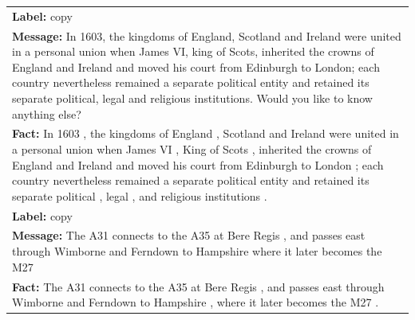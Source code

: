 \begin{table}
\begin{tabular}{p{15cm}}
        \midrule
        \textbf{Label:} copy                                                                                                                                                                                                                                                                                                                                                                                         \\
        \textbf{Message:} In 1603, the kingdoms of England, Scotland and Ireland were united in a personal union when James VI, king of Scots, inherited the crowns of England and Ireland and moved his court from Edinburgh to London; each country nevertheless remained a separate political entity and retained its separate political, legal and religious institutions. Would you like to know anything else? \\
        \textbf{Fact:} In 1603 , the kingdoms of England , Scotland and Ireland were united in a personal union when James VI , King of Scots , inherited the crowns of England and Ireland and moved his court from Edinburgh to London ; each country nevertheless remained a separate political entity and retained its separate political , legal , and religious institutions .                                 \\
        \midrule
        \textbf{Label:} copy                                                                                                                                                                                                                                                                                                                                                                                         \\
        \textbf{Message:} The A31 connects to the A35 at Bere Regis , and passes east through Wimborne and Ferndown to Hampshire where it later becomes the M27                                                                                                                                                                                                                                                      \\
        \textbf{Fact:} The A31 connects to the A35 at Bere Regis , and passes east through Wimborne and Ferndown to Hampshire , where it later becomes the M27 .                                                                                                                                                                                                                                                     \\

\end{tabular}
\end{table}
